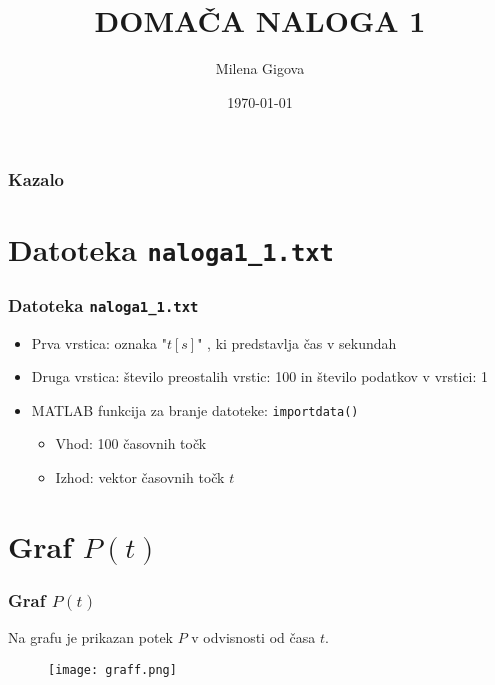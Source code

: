 \documentclass{beamer}
\title{DOMAČA NALOGA 1}
\author{Milena Gigova}
\date{\today}
\begin{document}
\frame{\titlepage}

\begin{frame}
\frametitle{Kazalo}
    \tableofcontents
\end{frame}

\section{Datoteka \texttt{naloga1\_1.txt}}
\begin{frame}
\frametitle{Datoteka \texttt{naloga1\_1.txt}}
    \begin{itemize}
        \item Prva vrstica: oznaka "$t[s]$" , ki predstavlja čas v sekundah
        \item Druga vrstica: število preostalih vrstic: 100 in 
        število podatkov v vrstici: 1
        \item MATLAB funkcija za branje datoteke: \texttt{importdata()}
        \begin{itemize}
            \item Vhod: 100 časovnih točk
            \item Izhod: vektor časovnih točk $t$
        \end{itemize}
    \end{itemize}
\end{frame}

\section{Graf $P(t)$}
\begin{frame}
\frametitle{Graf $P(t)$}
    \begin{itemize}
    Na grafu je prikazan potek $P$ v odvisnosti od časa $t$.
    \end{itemize}
    \begin{figure}
        \centering
        \texttt{[image: graff.png]} %
        
    \end{figure}
\end{frame}

\end{document}

